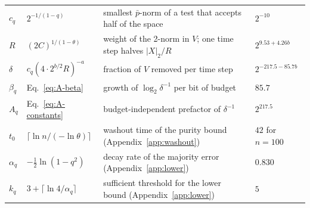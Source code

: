 \documentclass[aps,pra,reprint,superscriptaddress,floatfix]{revtex4-2}
\theoremstyle{plain}
\newcommand{\nrm}[2]{\lvert #1\rvert_{#2}}
\begin{document}
\begin{table}[t]
\begin{ruledtabular}
\begin{tabular}{p{1.1cm}p{3.3cm}p{9.2cm}p{2.6cm}}
{\raggedright $c_q$\par} & {\raggedright $2^{-1/(1-q)}$\par} & {\raggedright smallest $\bar p$-norm of a test that accepts half of the space\par} & {\raggedright $2^{-10}$\par} \\
{\raggedright $R$\par} & {\raggedright $(2C)^{1/(1-\theta)}$\par} & {\raggedright weight of the 2-norm in $V$; one time step halves $\nrm X2/R$\par} & {\raggedright $2^{9.53+4.26b}$\par} \\
{\raggedright $\delta$\par} & {\raggedright $c_q(4\cdot2^{b/2}R)^{-a}$\par} & {\raggedright fraction of $V$ removed per time step\par} & {\raggedright $2^{-217.5-85.7b}$\par} \\
{\raggedright $\beta_q$\par} & {\raggedright Eq.~\eqref{eq:A-beta}\par} & {\raggedright growth of $\log_2\delta^{-1}$ per bit of budget\par} & {\raggedright $85.7$\par} \\
{\raggedright $A_q$\par} & {\raggedright Eq.~\eqref{eq:A-constants}\par} & {\raggedright budget-independent prefactor of $\delta^{-1}$\par} & {\raggedright $2^{217.5}$\par} \\
{\raggedright $t_0$\par} & {\raggedright $\lceil\ln n/(-\ln\theta)\rceil$\par} & {\raggedright washout time of the purity bound (Appendix~\ref{app:washout})\par} & {\raggedright $42$ for $n=100$\par} \\
{\raggedright $\alpha_q$\par} & {\raggedright $-\frac12\ln(1-q^2)$\par} & {\raggedright decay rate of the majority error (Appendix~\ref{app:lower})\par} & {\raggedright $0.830$\par} \\
{\raggedright $k_q$\par} & {\raggedright $3+\lceil\ln4/\alpha_q\rceil$\par} & {\raggedright sufficient threshold for the lower bound (Appendix~\ref{app:lower})\par} & {\raggedright $5$\par} \\
\end{tabular}
\end{ruledtabular}
\endgroup
\end{table}
\end{document}
